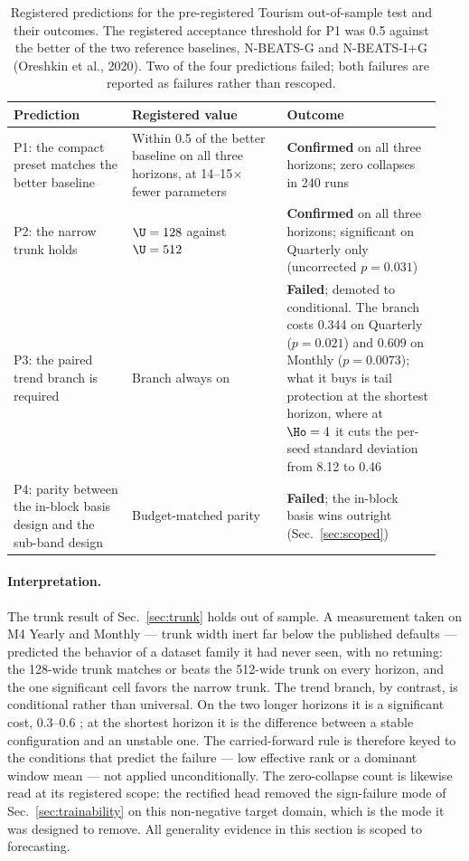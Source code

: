 \begin{table}[t]
  \centering
  \caption{Registered predictions for the pre-registered Tourism out-of-sample test
    and their outcomes. The registered acceptance threshold for P1 was 0.5 \smape{}
    against the better of the two reference baselines, N-BEATS-G and N-BEATS-I+G
    (Oreshkin et al., 2020). Two of the four predictions failed; both failures are
    reported as failures rather than rescoped.}
  \label{tab:tourism_predictions}
  \begin{tabular}{@{}p{0.26\linewidth}p{0.34\linewidth}p{0.34\linewidth}@{}}
    \toprule
    Prediction & Registered value & Outcome \\
    \midrule
    P1: the compact preset matches the better baseline
      & Within 0.5 \smape{} of the better baseline on all three horizons, at
        14--15$\times$ fewer parameters
      & \textbf{Confirmed} on all three horizons; zero collapses in 240 runs \\
    \addlinespace
    P2: the narrow trunk holds
      & $\U = 128$ against $\U = 512$
      & \textbf{Confirmed} on all three horizons; significant on Quarterly only
        (uncorrected $p = 0.031$) \\
    \addlinespace
    P3: the paired trend branch is required
      & Branch always on
      & \textbf{Failed}; demoted to conditional. The branch costs 0.344 \smape{} on
        Quarterly ($p = 0.021$) and 0.609 on Monthly ($p = 0.0073$); what it buys is
        tail protection at the shortest horizon, where at $\Ho = 4$ it cuts the
        per-seed standard deviation from 8.12 to 0.46 \\
    \addlinespace
    P4: parity between the in-block basis design and the sub-band design
      & Budget-matched parity
      & \textbf{Failed}; the in-block basis wins outright
        (Sec.~\ref{sec:scoped}) \\
    \bottomrule
  \end{tabular}
\end{table}

\paragraph{Interpretation.}
The trunk result of Sec.~\ref{sec:trunk} holds out of sample. A measurement taken on
M4 Yearly and Monthly --- trunk width inert far below the published defaults ---
predicted the behavior of a dataset family it had never seen, with no retuning: the
128-wide trunk matches or beats the 512-wide trunk on every horizon, and the one
significant cell favors the narrow trunk. The trend branch, by contrast, is
conditional rather than universal. On the two longer horizons it is a significant
cost, 0.3--0.6 \smape{}; at the shortest horizon it is the difference between a stable
configuration and an unstable one. The carried-forward rule is therefore keyed to the
conditions that predict the failure --- low effective rank or a dominant window mean
--- not applied unconditionally. The zero-collapse count is likewise read at its
registered scope: the rectified head removed the sign-failure mode of
Sec.~\ref{sec:trainability} on this non-negative target domain, which is the mode it
was designed to remove. All generality evidence in this section is scoped to
forecasting.
